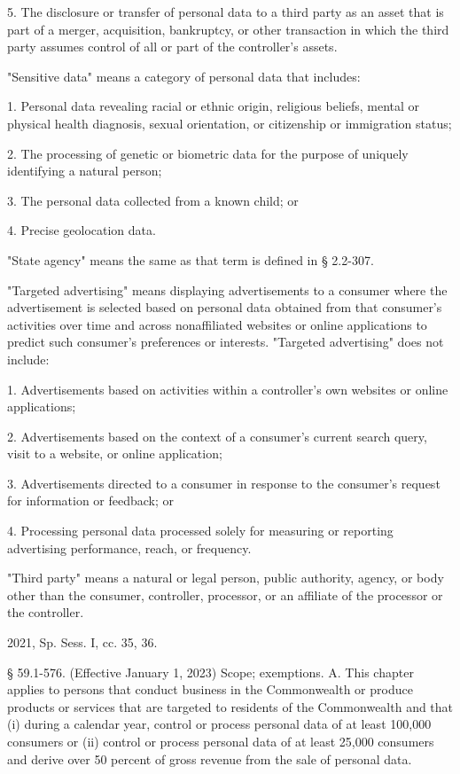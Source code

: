 5. The disclosure or transfer of personal data to a third party as an asset that is part of a merger, acquisition, bankruptcy, or other transaction in which the third party assumes control of all or part of the controller's assets.

"Sensitive data" means a category of personal data that includes:

1. Personal data revealing racial or ethnic origin, religious beliefs, mental or physical health diagnosis, sexual orientation, or citizenship or immigration status;

2. The processing of genetic or biometric data for the purpose of uniquely identifying a natural person;

3. The personal data collected from a known child; or

4. Precise geolocation data.

"State agency" means the same as that term is defined in § 2.2-307.

"Targeted advertising" means displaying advertisements to a consumer where the advertisement is selected based on personal data obtained from that consumer's activities over time and across nonaffiliated websites or online applications to predict such consumer's preferences or interests. "Targeted advertising" does not include:

1. Advertisements based on activities within a controller's own websites or online applications;

2. Advertisements based on the context of a consumer's current search query, visit to a website, or online application;

3. Advertisements directed to a consumer in response to the consumer's request for information or feedback; or

4. Processing personal data processed solely for measuring or reporting advertising performance, reach, or frequency.

"Third party" means a natural or legal person, public authority, agency, or body other than the consumer, controller, processor, or an affiliate of the processor or the controller.

2021, Sp. Sess. I, cc. 35, 36.

§ 59.1-576. (Effective January 1, 2023) Scope; exemptions.
A. This chapter applies to persons that conduct business in the Commonwealth or produce products or services that are targeted to residents of the Commonwealth and that (i) during a calendar year, control or process personal data of at least 100,000 consumers or (ii) control or process personal data of at least 25,000 consumers and derive over 50 percent of gross revenue from the sale of personal data.

